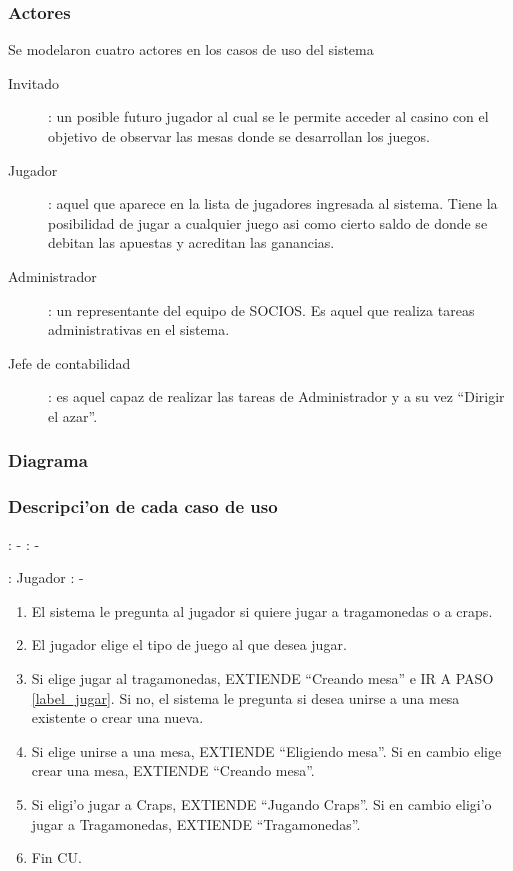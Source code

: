 \subsubsection{Actores}
Se modelaron cuatro actores en los casos de uso del sistema

\begin{description}
\item[Invitado]: un posible futuro jugador al cual se le permite acceder al casino con el objetivo de observar las mesas donde se desarrollan los juegos.
\item[Jugador]: aquel que aparece en la lista de jugadores ingresada al sistema. Tiene la posibilidad de jugar a cualquier juego asi como cierto saldo de donde se debitan las apuestas y acreditan las ganancias.
\item[Administrador]: un representante del equipo de SOCIOS. Es aquel que realiza tareas administrativas en el sistema.
\item[Jefe de contabilidad]: es aquel capaz de realizar las tareas de Administrador y a su vez ``Dirigir el azar''.
\end{description}



\subsubsection{Diagrama}


\subsubsection{Descripci'on de cada caso de uso}

: - \newline
\indent{}: -

: Jugador \newline
\indent{}: -

\begin{enumerate}
\item El sistema le pregunta al jugador si quiere jugar a tragamonedas o a craps.
\item El jugador elige el tipo de juego al que desea jugar.
\item Si elige jugar al tragamonedas, EXTIENDE ``Creando mesa'' e IR A PASO \ref{label_jugar}. Si no, el sistema le pregunta si desea unirse a una mesa existente o crear una nueva.
\item Si elige unirse a una mesa, EXTIENDE ``Eligiendo mesa''. Si en cambio elige crear una mesa, EXTIENDE ``Creando mesa''.
\item Si eligi'o jugar a Craps, EXTIENDE ``Jugando Craps''. Si en cambio eligi'o jugar a Tragamonedas, EXTIENDE ``Tragamonedas''.\label{label_jugar}
\item Fin CU.
\end{enumerate}



